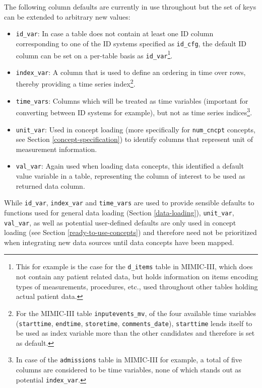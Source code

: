 \documentclass[
  notitle,
  nojss,
  noheadings]{jss}
\providecommand{\tightlist}{%
  \setlength{\itemsep}{0pt}\setlength{\parskip}{0pt}}
\begin{document}
The following column defaults are currently in use throughout 
but the set of keys can be extended to arbitrary new values:

\begin{itemize}
\tightlist
\item
  \texttt{id\_var}: In case a table does not contain at least one ID
  column corresponding to one of the ID systems specified as
  \texttt{id\_cfg}, the default ID column can be set on a per-table
  basis as \texttt{id\_var}\footnote{This for example is the case for
    the \texttt{d\_items} table in MIMIC-III, which does not contain any
    patient related data, but holds information on items encoding types
    of measurements, procedures, etc., used throughout other tables
    holding actual patient data.}.
\item
  \texttt{index\_var}: A column that is used to define an ordering in
  time over rows, thereby providing a time series index\footnote{For the
    MIMIC-III table \texttt{inputevents\_mv}, of the four available time
    variables (\texttt{starttime}, \texttt{endtime}, \texttt{storetime},
    \texttt{comments\_date}), \texttt{starttime} lends itself to be used
    as index variable more than the other candidates and therefore is
    set as default.}.
\item
  \texttt{time\_vars}: Columns which will be treated as time variables
  (important for converting between ID systems for example), but not as
  time series indices\footnote{In case of the \texttt{admissions} table
    in MIMIC-III for example, a total of five columns are considered to
    be time variables, none of which stands out as potential
    \texttt{index\_var}.}.
\item
  \texttt{unit\_var}: Used in concept loading (more specifically for
  \texttt{num\_cncpt} concepts, see Section \ref{concept-specification})
  to identify columns that represent unit of measurement information.
\item
  \texttt{val\_var}: Again used when loading data concepts, this
  identified a default value variable in a table, representing the
  column of interest to be used as returned data column.
\end{itemize}

While \texttt{id\_var}, \texttt{index\_var} and \texttt{time\_vars} are
used to provide sensible defaults to functions used for general data
loading (Section \ref{data-loading}), \texttt{unit\_var},
\texttt{val\_var}, as well as potential user-defined defaults are only
used in concept loading (see Section \ref{ready-to-use-concepts}) and
therefore need not be prioritized when integrating new data sources
until data concepts have been mapped.
\end{document}
